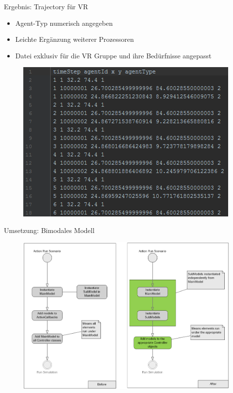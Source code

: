 \begin{frame}{Ergebnis: Trajectory für VR}
	\begin{minipage}{0.4\textwidth}
		\begin{itemize}
			\item Agent-Typ numerisch angegeben
			\item Leichte Ergänzung weiterer Prozessoren
			\item Datei exklusiv für die VR Gruppe und ihre Bedürfnisse angepasst
		\end{itemize}
	\end{minipage} \hfill
	\begin{minipage}{0.5\textwidth}
			\begin{figure}[H]
				\includegraphics[width=\textwidth]{appendix/images/Trajectory.png}
			\end{figure}
	\end{minipage}
\end{frame}

\begin{frame}{Umsetzung: Bimodales Modell}
	\begin{figure}
		\includegraphics[width=\textwidth, height=0.8\textwidth, keepaspectratio]{appendix/uml/MotionModels.png}
	\end{figure}
\end{frame}

